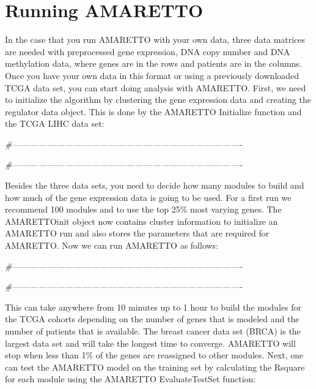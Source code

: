 \documentclass[8pt,a4,]{article}
\newcommand{\hlcom}[1]{\textcolor[rgb]{0.502,0.502,0.502}{\textit{#1}}}%
\newenvironment{Shaded}{\begin{myshaded}}{\end{myshaded}}
\newcommand{\CommentTok}[1]{\hlcom{#1}}
\begin{document}
\section{Running AMARETTO}\label{running-amaretto}

In the case that you run AMARETTO with your own data, three data
matrices are needed with preprocessed gene expression, DNA copy number
and DNA methylation data, where genes are in the rows and patients are
in the columns. Once you have your own data in this format or using a
previously downloaded TCGA data set, you can start doing analysis with
AMARETTO. First, we need to initialize the algorithm by clustering the
gene expression data and creating the regulator data object. This is
done by the AMARETTO Initialize function and the TCGA LIHC data set:

\begin{Shaded}
\begin{Highlighting}[]
\CommentTok{#-------------------------------------------------------------------------------}



\CommentTok{#-------------------------------------------------------------------------------}
\end{Highlighting}
\end{Shaded}

Besides the three data sets, you need to decide how many modules to
build and how much of the gene expression data is going to be used. For
a first run we recommend 100 modules and to use the top 25\% most
varying genes. The AMARETTOinit object now contains cluster information
to initialize an AMARETTO run and also stores the parameters that are
required for AMARETTO. Now we can run AMARETTO as follows:

\begin{Shaded}
\begin{Highlighting}[]
\CommentTok{#-------------------------------------------------------------------------------}


\CommentTok{#-------------------------------------------------------------------------------}
\end{Highlighting}
\end{Shaded}

This can take anywhere from 10 minutes up to 1 hour to build the modules
for the TCGA cohorts depending on the number of genes that is modeled
and the number of patients that is available. The breast cancer data set
(BRCA) is the largest data set and will take the longest time to
converge. AMARETTO will stop when less than 1\% of the genes are
reassigned to other modules. Next, one can test the AMARETTO model on
the training set by calculating the Rsquare for each module using the
AMARETTO EvaluateTestSet function:
\end{document}
